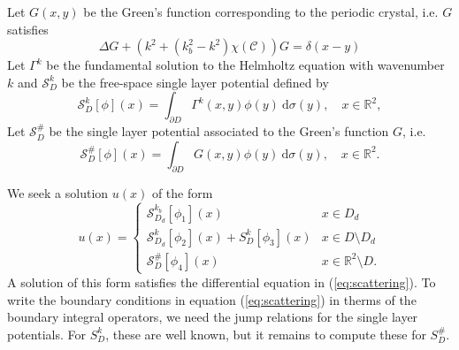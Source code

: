 \documentclass[a4paper]{article}
\theoremstyle{definition}
\newcommand{\R}{\mathbb{R}}
\newcommand{\C}{\mathcal{C}}
\newcommand{\dx}{\: \mathrm{d}}
\newcommand{\Scrystal}{\mathcal{S}_D^\#}
\newcommand{\eqnref}[1]{(\ref {#1})}
\begin{document}
Let $G(x,y)$ be the Green's function corresponding to the periodic crystal, i.e. $G$ satisfies
\begin{equation*} \label{eq:G}
\Delta G + (k^2+(k_b^2-k^2)\chi(\C))G = \delta(x-y)
\end{equation*}
Let $\Gamma^k$ be the fundamental solution to the Helmholtz equation with wavenumber $k$ and $\mathcal{S}_{D}^k$ be the free-space single layer potential defined by
\begin{equation*}
\mathcal{S}_D^k[\phi](x) = \int_{\partial D} \Gamma^k(x,y)\phi(y) \dx \sigma(y), \quad x \in \R^2,
\end{equation*}
Let $\Scrystal$ be the single layer potential associated to the Green's function $G$, i.e.
\begin{equation*}
\Scrystal[\phi](x) = \int_{\partial D} G(x,y)\phi(y) \dx \sigma(y) , \quad x \in \R^2.
\end{equation*}

We seek a solution $u(x)$ of the form
\begin{equation} \label{eq:sol}
u(x) = \begin{cases}
\mathcal{S}_{D_d}^{k_b}[\phi_1](x) \quad &x\in D_d \\
\mathcal{S}_{D_d}^{k}[\phi_2](x) + S_D^k[\phi_3](x) & x\in D\setminus D_d \\
\Scrystal[\phi_4](x) & x \in \R^2\setminus D.
\end{cases}
\end{equation}
A solution of this form satisfies the differential equation in \eqnref{eq:scattering}. To write the boundary conditions in equation \eqnref{eq:scattering} in therms of the boundary integral operators, we need the jump relations for the single layer potentials. For $S_D^k$, these are well known, but it remains to compute these for $S_D^\#$.
\end{document}

